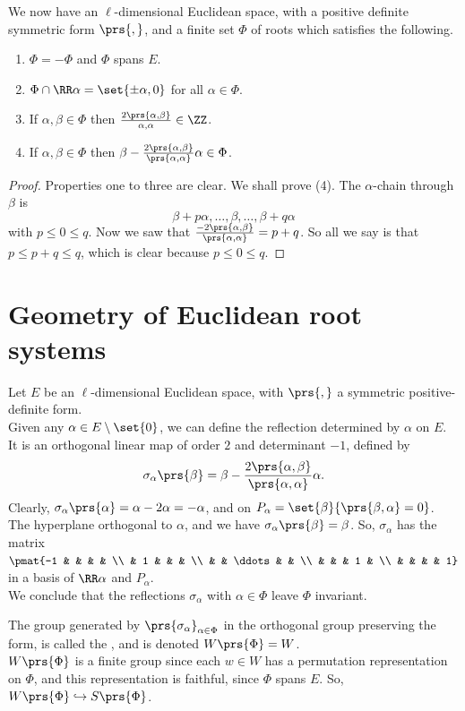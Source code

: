 \documentclass[10pt,a4paper,twoside,openany,hidelinks]{book}
\begin{document}
\begin{proposition}
We now have an $\ell$-dimensional Euclidean space, with a positive definite symmetric form $\prs{,}$, and a finite set $\Phi$ of roots which satisfies the following.
\begin{enumerate}[label = (\arabic*)]
\item $\Phi = -\Phi$ and $\Phi$ spans $E$.
\item $\Phi \cap \RR \alpha = \set{\pm \alpha, 0}$ for all $\alpha \in \Phi$.
\item If $\alpha,\beta \in \Phi$ then $\frac{2 \prs{\alpha,\beta}}{\alpha,\alpha} \in \ZZ$.
\item If $\alpha,\beta \in \Phi$ then $\beta - \frac{2\prs{\alpha,\beta}}{\prs{\alpha,\alpha}}\alpha \in \Phi$.
\end{enumerate}
\end{proposition}
\begin{proof}
Properties one to three are clear. We shall prove (4).
The $\alpha$-chain through $\beta$ is \[\beta + p\alpha, \ldots, \beta, \ldots, \beta + q\alpha\]
with $p \leq 0 \leq q$.
Now we saw that $\frac{-2\prs{\alpha,\beta}}{\prs{\alpha,\alpha}} = p+q$.
So all we say is that $p \leq p +q \leq q$, which is clear because $p \leq 0 \leq q$.
\end{proof}

\section{Geometry of Euclidean root systems}

Let $E$ be an $\ell$-dimensional Euclidean space, with $\prs{,}$ a symmetric positive-definite form.
\\
Given any $\alpha \in E \setminus \set{0}$, we can define the reflection determined by $\alpha$ on $E$. It is an orthogonal linear map of order $2$ and determinant $-1$, defined by
\[\sigma_{\alpha}\prs{\beta} = \beta - \frac{2\prs{\alpha,\beta}}{\prs{\alpha,\alpha}} \alpha \text{.}\]
Clearly, $\sigma_{\alpha}\prs{\alpha} = \alpha - 2\alpha = -\alpha$, and on $P_{\alpha} = \set{\beta}{\prs{\beta,\alpha} = 0}$. The hyperplane orthogonal to $\alpha$, and we have $\sigma_{\alpha}\prs{\beta} = \beta$.
So, $\sigma_{\alpha}$ has the matrix $\pmat{-1 & & & & \\ & 1 & & & \\ & & \ddots & & \\ & & & 1 & \\ & & & & 1}$ in a basis of $\RR \alpha$ and $P_{\alpha}$.\\
We conclude that the reflections $\sigma_{\alpha}$ with $\alpha \in \Phi$ leave $\Phi$ invariant.
\\
\begin{definition}
The group generated by $\prs{\sigma_{\alpha}}_{\alpha \in \Phi}$ in the orthogonal group preserving the form, is called the , and is denoted $W\prs{\Phi} = W$.\\
$W\prs{\Phi}$ is a finite group since each $w \in W$ has a permutation representation on $\Phi$, and this representation is faithful, since $\Phi$ spans $E$. So, $W\prs{\Phi} \hookrightarrow{S\prs{\Phi}}$.
\end{definition}
\end{document}
